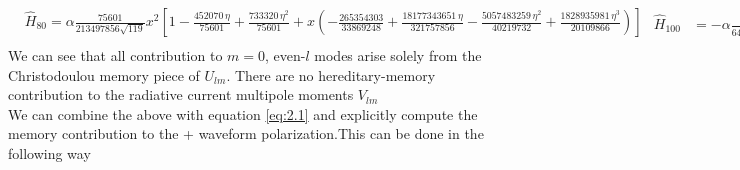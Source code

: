 \documentclass[twocolumn,showpacs,aps,prd,nobibnotes,floatfix]{revtex4-1}
\begin{document}
\begin{widetext}
\begin{subequations}
\begin{align}\label{eq:H80}
	&\hat{H}_{80} =\alpha\frac{75601}{213497856\sqrt{119}}x^2\left[1-\frac{452070\,\eta}{75601} + \frac{733320\,\eta^2}{75601} + x\left(-\frac{265354303}{33869248} + \frac{18177343651\,\eta}{321757856} - \frac{5057483259\,\eta^2}{40219732} + \frac{1828935981\,\eta^3}{20109866}\right)\right]\nonumber\\	
\end{align}
\begin{align}\label{eq:H80}
\hat{H}_{100} &=-\alpha\frac{525221\,x^3}{6452379648\sqrt{154}}\left(1 - \frac{79841784\,\eta}{9979199} + \frac{198570240\,\eta^2}{9979199} -\frac{172307520\,\eta^3}{9979199}\right)
\end{align}
\end{subequations}
We can see that all contribution to $m=0$, even-$l$ modes arise solely from the Christodoulou memory piece of $U_{lm}$. There are no hereditary-memory contribution to the radiative current multipole moments $V_{lm}$\\
We can combine the above with equation \ref{eq:2.1} and explicitly compute the memory contribution to the + waveform polarization.This can be done in the following way


\end{widetext}
\end{document}
